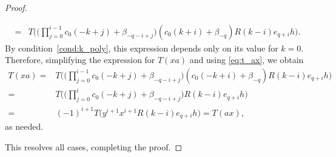 \documentclass[10pt,a4paper]{amsart}
\begin{document}
\begin{proof}
\begin{itemize}
\begin{align*}
 ={}& T\Bigg( \Bigg(
 \prod\limits_{j = 0}^{i - 1}
 c_0 (-k + j) + \beta_{-q - i + j}
 \Bigg)
( c_0 (k + i) + \beta_{-q})
 R(k - i) e_{q + i} h \Bigg).
 \end{align*}
 By condition~\ref{cond:k_poly},
 this expression depends only on its value
 for $k = 0$.
 Therefore, simplifying the expression for $T(xa)$
 and using \eqref{eq:t_ax}, we obtain
 \begin{align*}
 T(xa)
 ={}& T\Bigg( \Bigg(
 \prod\limits_{j = 0}^{i - 1}
 c_0 (-k + j) + \beta_{-q - i + j}
 \Bigg)
( c_0 (-k + i) + \beta_{-q})
 R(k - i) e_{q + i} h \Bigg) \\
 ={}& T\Bigg( \Bigg(
 \prod\limits_{j = 0}^i
 c_0 (-k + j) + \beta_{-q - i + j}
 \Bigg)
 R(k - i) e_{q + i} h \Bigg) \\
 ={}& (-1)^{i + 1} T\bigl( y^{i + 1} x^{i + 1}
 R(k - i) e_{q + i} h \bigr) = T(ax),
 \end{align*}
 as needed.
 \end{itemize}
 This resolves all cases, completing the proof.
\end{proof}
\end{document}
